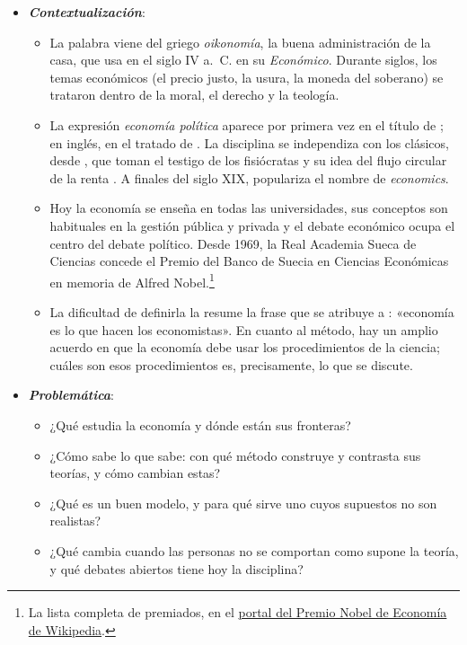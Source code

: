 \documentclass[11pt]{article}
\begin{document}
\begin{itemize}
\item \textbf{\emph{Contextualización}}:
  \begin{itemize}
  \item La palabra viene del griego \emph{oikonomía}, la buena administración de la casa, que  usa en el siglo IV a.~C. en su \emph{Económico}. Durante siglos, los temas económicos (el precio justo, la usura, la moneda del soberano) se trataron dentro de la moral, el derecho y la teología.
  \item La expresión \emph{economía política} aparece por primera vez en el título de \textcite{Montchrestien1615Traicte}; en inglés, en el tratado de \textcite{Steuart1767Inquiry}. La disciplina se independiza con los clásicos, desde \textcite{Smith1776Wealth}, que toman el testigo de los fisiócratas y su idea del flujo circular de la renta . A finales del siglo XIX,  populariza el nombre de \emph{economics}\nocite{Marshall1890Principles}.
  \item Hoy la economía se enseña en todas las universidades, sus conceptos son habituales en la gestión pública y privada y el debate económico ocupa el centro del debate político. Desde 1969, la Real Academia Sueca de Ciencias concede el Premio del Banco de Suecia en Ciencias Económicas en memoria de Alfred Nobel\nocite{NobelPrize2026Economia}.\footnote{La lista completa de premiados, en el \href{https://es.wikipedia.org/wiki/Portal:Premios_Nobel/Premio_Nobel_de_Econom\%C3\%ADa}{portal del Premio Nobel de Economía de Wikipedia}.}
  \item La dificultad de definirla la resume la frase que se atribuye a : «economía es lo que hacen los economistas». En cuanto al método, hay un amplio acuerdo en que la economía debe usar los procedimientos de la ciencia; cuáles son esos procedimientos es, precisamente, lo que se discute.
  \end{itemize}

\item \textbf{\emph{Problemática}}:
  \begin{itemize}
  \item ¿Qué estudia la economía y dónde están sus fronteras?
  \item ¿Cómo sabe lo que sabe: con qué método construye y contrasta sus teorías, y cómo cambian estas?
  \item ¿Qué es un buen modelo, y para qué sirve uno cuyos supuestos no son realistas?
  \item ¿Qué cambia cuando las personas no se comportan como supone la teoría, y qué debates abiertos tiene hoy la disciplina?
  \end{itemize}


\end{itemize}
\end{document}

